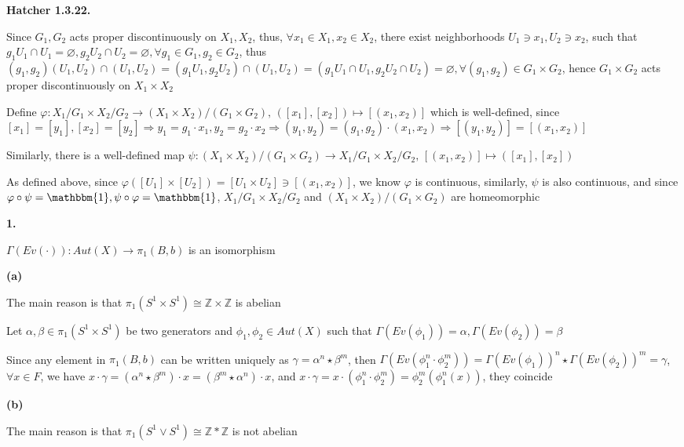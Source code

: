 \documentclass[../main.tex]{subfiles}
\begin{document}
\textbf{Hatcher 1.3.22.} \par
Since $G_1,G_2$ acts proper discontinuously on $X_1, X_2$, thus, $\forall x_1\in X_1,x_2\in X_2$, there exist neighborhoods $U_1\ni x_1,U_2\ni x_2$, such that $g_1U_1\cap U_1=\varnothing,g_2U_2\cap U_2=\varnothing, \forall g_1\in G_1, g_2\in G_2$, thus $(g_1,g_2)(U_1,U_2)\cap(U_1,U_2)=(g_1U_1,g_2U_2)\cap(U_1,U_2)=(g_1U_1\cap U_1,g_2U_2\cap U_2)=\varnothing, \forall (g_1,g_2)\in G_1\times G_2$, hence $G_1\times G_2$ acts proper discontinuously on $X_1\times X_2$ \par
Define $\varphi: X_1/G_1\times X_2/G_2\rightarrow (X_1\times X_2)/(G_1\times G_2), \, ([x_1],[x_2])\mapsto [(x_1,x_2)]$ which is well-defined, since $[x_1]=[y_1],[x_2]=[y_2]\Rightarrow y_1=g_1\cdot x_1,y_2=g_2\cdot x_2\Rightarrow (y_1,y_2)=(g_1,g_2)\cdot (x_1,x_2)\Rightarrow [(y_1,y_2)]=[(x_1,x_2)]$ \par
Similarly, there is a well-defined map $\psi:  (X_1\times X_2)/(G_1\times G_2)\rightarrow X_1/G_1\times X_2/G_2,\, [(x_1,x_2)]\mapsto ([x_1],[x_2])$ \par
As defined above, since $\varphi([U_1]\times[U_2])=[U_1\times U_2]\ni [(x_1,x_2)]$, we know $\varphi$ is continuous, similarly, $\psi$ is also continuous, and since $\varphi\circ\psi=\mathbbm{1},\psi\circ\varphi=\mathbbm{1}$, $X_1/G_1\times X_2/G_2$ and $(X_1\times X_2)/(G_1\times G_2)$ are homeomorphic \par
\textbf{1.} \par
$\Gamma(Ev(\cdot)): Aut(X)\rightarrow \pi_1(B,b)$ is an isomorphism \par
\textbf{(a)} \par
The main reason is that $\pi_1(S^1\times S^1)\cong \mathbb{Z}\times\mathbb{Z}$ is abelian \par
Let $\alpha,\beta\in\pi_1(S^1\times S^1)$ be two generators and $\phi_1,\phi_2\in Aut(X)$ such that $\Gamma(Ev(\phi_1))=\alpha, \Gamma(Ev(\phi_2))=\beta$ \par
Since any element in $\pi_1(B,b)$ can be written uniquely as $\gamma=\alpha^n\star\beta^m$, then $\Gamma(Ev(\phi_1^n\cdot\phi_2^m))=\Gamma(Ev(\phi_1))^n\star\Gamma(Ev(\phi_2))^m=\gamma$, $\forall x\in F$, we have $x\cdot\gamma=(\alpha^n\star\beta^m)\cdot x=(\beta^m\star\alpha^n)\cdot x$, and $x\cdot\gamma=x\cdot(\phi_1^n\cdot\phi_2^m)=\phi_2^m(\phi_1^n(x))$, they coincide \par
\textbf{(b)} \par
The main reason is that $\pi_1(S^1\vee S^1)\cong\mathbb{Z}*\mathbb{Z}$ is not abelian \par
\end{document}
